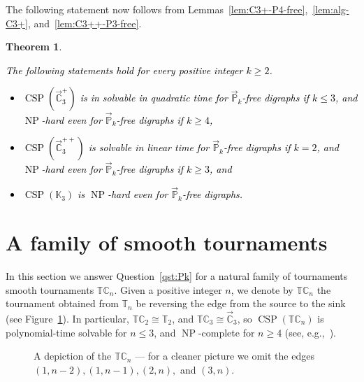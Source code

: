 \documentclass{article}
\newtheorem{theorem}{Theorem}
\theoremstyle{definition}
\theoremstyle{remark}
\newcommand{\blue}[1]{\textcolor{black}{#1}}
\DeclareMathOperator{\NP}{NP}
\DeclareMathOperator{\CSP}{CSP}
\newcommand{\bC}{{\mathbb C}}
\newcommand{\bK}{{\mathbb K}}
\newcommand{\bP}{{\mathbb P}}
\newcommand{\bT}{{\mathbb T}}
\begin{document}
The following statement now follows from Lemmas~\ref{lem:C3+-P4-free},~\ref{lem:alg-C3+}, and~\ref{lem:C3++-P3-free}.

\begin{theorem}\label{thm:Pk-3vertex-classification}
    \blue{The following statements hold for every positive integer $k\ge 2$.
    \begin{itemize}
        \item $\CSP(\vec{\bC}_3^+)$ is in solvable in quadratic time for $\vec{\bP}_k$-free digraphs
        if $k\le 3$, and $\NP$-hard even for $\vec{\bP}_k$-free digraphs if $k\ge 4$, 
        \item $\CSP(\vec{\bC}_3^{++})$ is solvable in linear time for $\vec{\bP}_k$-free digraphs
        if $k = 2$, and  $\NP$-hard even for $\vec{\bP}_k$-free digraphs if $k\ge 3$, and
        \item $\CSP(\bK_3)$ is $\NP$-hard even for $\vec{\bP}_k$-free digraphs.
    \end{itemize}}
\end{theorem}


\section{A family of smooth tournaments}
\label{sect:tournaments}

In this section we answer Question~\ref{qst:Pk} for a natural family of tournaments 
smooth tournaments $\bT\bC_n$. 
Given a positive integer $n$, we denote by $\bT\bC_n$
the tournament obtained from $\bT_n$ be reversing the edge from the source to the sink (see
Figure~\ref{fig:TCn}). In particular, 
$\bT\bC_2 \cong \bT_2$, and $\bT\bC_3 \cong \vec{\bC}_3$, so $\CSP(\bT\bC_n)$ is
polynomial-time solvable for $n \le 3$, and $\NP$-complete for $n\ge 4$
(see, e.g.,~\cite{bangjensenSIDMA1}).


\begin{figure}[ht!]
\centering
{}
\caption{
A depiction of the $\bT\bC_n$ --- for a cleaner picture we omit the edges $(1,n-2), (1,n-1), (2,n),$ and $(3,n)$.}
\label{fig:TCn}
\end{figure}
\end{document}
